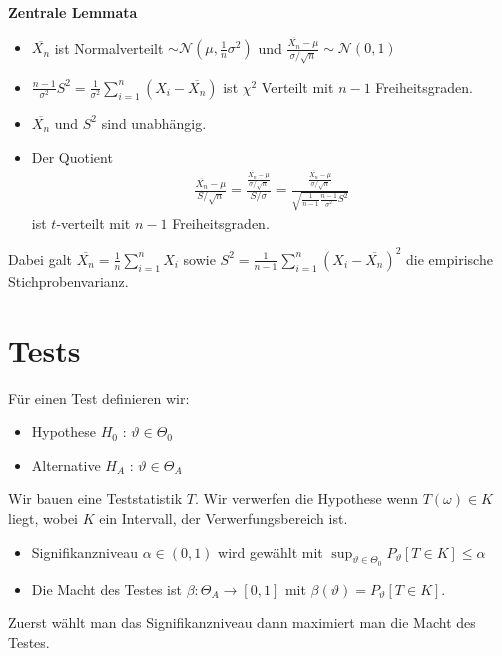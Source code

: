 \documentclass[25pt]{sciposter}
\newenvironment{thm}[1]{\begin{mdframed}[backgroundcolor=pink!20,innertopmargin=15pt, innerbottommargin=15pt, nobreak=true]
		\textbf{#1 }
	}
	{ 
	\end{mdframed}
}
\begin{document}
\begin{multicols}{3}
\begin{thm}{Zentrale Lemmata}
	\begin{itemize}
		\item $\overline{X_n}$ ist Normalverteilt $\sim \mathcal{N}(\mu,\frac{1}{n}\sigma^2)$ und $\frac{\overline{X_n} - \mu}{\sigma / \sqrt{n}} \sim \mathcal{N}(0,1)$
		\item $\frac{n-1}{\sigma^2}S^2 = \frac{1}{\sigma^2}\sum_{i=1}^{n}(X_i - \overline{X_n})$ ist $\chi^2$ Verteilt mit $n-1$ Freiheitsgraden.
		\item $\overline{X_n}$ und $S^2$ sind unabhängig.
		\item Der Quotient
		\begin{align*}
\frac{\overline{X_n}-\mu}{S/\sqrt{n}} = \frac{\frac{\overline{X_n} - \mu}{\sigma / \sqrt{n}}}{S/\sigma} = \frac{\frac{\overline{X_n} - \mu}{\sigma / \sqrt{n}}}{\sqrt{\frac{1}{n-1} \frac{n-1}{\sigma^2} S^2}}
		\end{align*}
		ist $t$-verteilt mit $n-1$ Freiheitsgraden.
	\end{itemize}
Dabei galt $\overline{X_n} = \frac{1}{n}\sum_{i=1}^{n} X_i$ sowie $S^2 = \frac{1}{n-1} \sum_{i=1}^{n} (X_i -\overline{X_n})^2$ die empirische Stichprobenvarianz.
\end{thm}

\section{Tests}

Für einen Test definieren wir:
\begin{itemize}
	\item Hypothese $H_0$ : $\vartheta \in \Theta_0$
	\item Alternative $H_A$ : $\vartheta \in \Theta_A$
\end{itemize}

Wir bauen eine Teststatistik $T$. Wir verwerfen die Hypothese wenn $T(\omega) \in K$ liegt, wobei $K$ ein Intervall, der Verwerfungsbereich ist.

\begin{itemize}
	\item Signifikanzniveau $\alpha \in (0,1)$ wird gewählt mit $\sup_{\vartheta\in \Theta_0} P_{\vartheta} \left[T\in K\right] \leq \alpha$
	\item Die Macht des Testes ist $\beta : \Theta_A \to [0,1]$ mit $\beta(\vartheta) = P_{\vartheta}[T\in K]$.
\end{itemize}

Zuerst wählt man das Signifikanzniveau dann maximiert man die Macht des Testes.


\end{multicols}
\end{document}
